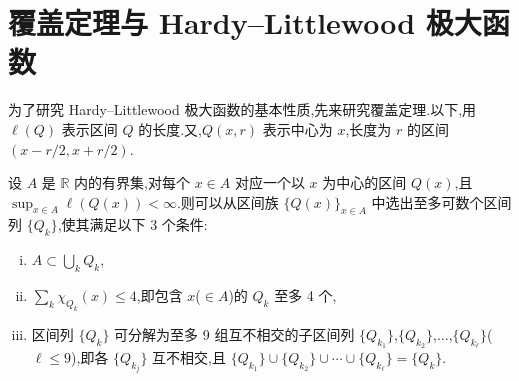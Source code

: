 \section{覆盖定理与 Hardy--Littlewood 极大函数}\label{sec:1.5}


为了研究 Hardy--Littlewood 极大函数的基本性质,先来研究覆盖定理.以下,用 $\ell(Q)$ 表示区间 $Q$ 的长度.又,$Q(x, r)$ 表示中心为 $x$,长度为 $r$ 的区间 $(x - r/2, x + r/2)$.

\begin{theorem}\label{thm:1.5.1}
设 $A$ 是 $\mathbb{R}$ 内的有界集,对每个 $x \in A$ 对应一个以 $x$ 为中心的区间 $Q(x)$,且 $\sup_{x \in A}\ell(Q(x)) < \infty$.则可以从区间族 $\{Q(x)\}_{x \in A}$ 中选出至多可数个区间列 $\{Q_{k}\}$,使其满足以下 3 个条件:

\begin{enumerate}[(i)]
\item $A \subset \bigcup_{k}Q_{k}$,
\item $\sum_{k}\chi_{Q_{k}}(x) \leq 4$,即包含 $x$($\in A$)的 $Q_{k}$ 至多 4 个,
\item 区间列 $\{Q_{k}\}$ 可分解为至多 9 组互不相交的子区间列 $\{Q_{k_{1}}\}$,$\{Q_{k_{2}}\}$,$\ldots$,$\{Q_{k_{\ell}}\}$($\ell \leq 9$),即各 $\{Q_{k_{j}}\}$ 互不相交,且 $\{Q_{k_{1}}\} \cup \{Q_{k_{2}}\} \cup \cdots \cup \{Q_{k_{\ell}}\} = \{Q_{k}\}$.
\end{enumerate}
\end{theorem}

